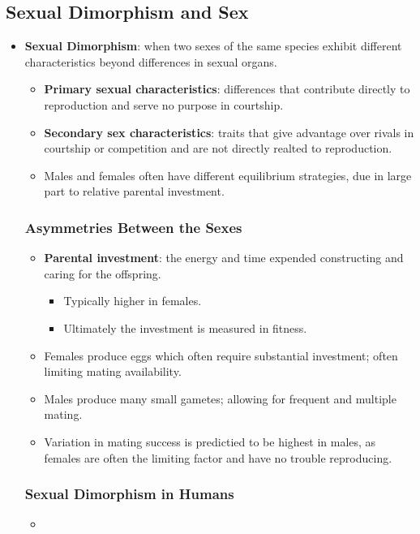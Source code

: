 \documentclass[12pt,a4paper]{article}
\begin{document}
\subsection{Sexual Dimorphism and Sex}
\begin{itemize}
    \item \textbf{Sexual Dimorphism}: when two sexes of the same species exhibit different characteristics beyond differences in sexual organs.
        \begin{itemize}
            \item \textbf{Primary sexual characteristics}: differences that contribute directly to reproduction and serve no purpose in courtship.
            \item \textbf{Secondary sex characteristics}: traits that give advantage over rivals in courtship or competition and are not directly realted to reproduction.
            \item Males and females often have different equilibrium strategies, due in large part to relative parental investment.
        \end{itemize}
    \subsubsection{Asymmetries Between the Sexes}
        \begin{itemize}
            \item \textbf{Parental investment}: the energy and time expended constructing and caring for the offspring.
                \begin{itemize}
                    \item Typically higher in females.
                    \item Ultimately the investment is measured in fitness.
                \end{itemize}
            \item Females produce eggs which often require substantial investment; often limiting mating availability.
            \item Males produce many small gametes; allowing for frequent and multiple mating.
            \item Variation in mating success is predictied to be highest in males, as females are often the limiting factor and have no trouble reproducing.
        \end{itemize}
    \subsubsection{Sexual Dimorphism in Humans}
    \begin{itemize}
        \item 
    \end{itemize}
\end{itemize}
\end{document}
